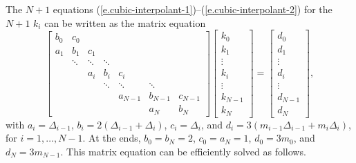 \begin{sidebar}
\label{sb.solving-tridiagonal-system}
The $N+1$ equations (\ref{e.cubic-interpolant-1})--(\ref{e.cubic-interpolant-2}) for the $N+1$ $k_{i}$ can be written as the matrix equation
\[
\left[\begin{array}{cccccccccc}
	b_{0} & c_{0} \\
	a_{1} & b_{1} & c_{1} \\
	& \ddots & \ddots & \ddots \\
	& & a_{i} & b_{i} & c_{i} \\
	& & & \ddots & \ddots & \ddots \\
	& & & & a_{N-1} & b_{N-1} & c_{N-1} \\
	& & & & & a_{N} & b_{N} 
\end{array}\right]
\left[\begin{array}{c}
	k_{0}\\
	k_{1}\\
	\vdots\\
	k_{i}\\
	\vdots\\
	k_{N-1}\\
	k_{N}
\end{array}\right] = 
\left[\begin{array}{c}
	d_{0}\\
	d_{1}\\
	\vdots\\
	d_{i}\\
	\vdots\\
	d_{N-1}\\
	d_{N}
\end{array}\right],
\]
with $a_{i} = \Delta_{i-1}$, $b_{i} = 2(\Delta_{i-1}+\Delta_{i})$, $c_{i} = \Delta_{i}$, and $d_{i} = 3(m_{i-1}\Delta_{i-1}+m_{i}\Delta_{i})$, for $i=1,\ldots,N-1$. At the ends, $b_{0}=b_{N}=2$, $c_{0}=a_{N}=1$, $d_{0}=3m_{0}$, and $d_{N}=3m_{N-1}$.
This  matrix equation can be efficiently solved as follows.


\end{sidebar}
